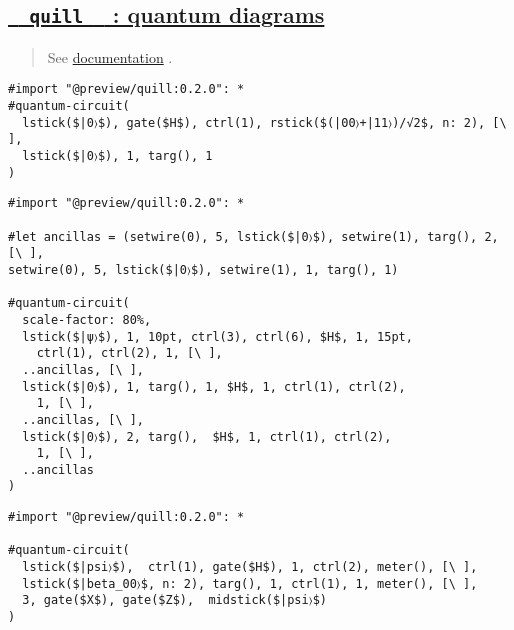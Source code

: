 \pandocbounded{}

\subsection{\texorpdfstring{\hyperref[quill-quantum-diagrams]{\texttt{\ }{\texttt{\ quill\ }}\texttt{\ }
: quantum
diagrams}}{  quill   : quantum diagrams}}\label{quill-quantum-diagrams}

\begin{quote}
See \href{https://github.com/Mc-Zen/quill/tree/main}{documentation} .
\end{quote}

\begin{verbatim}
#import "@preview/quill:0.2.0": *
#quantum-circuit(
  lstick($|0〉$), gate($H$), ctrl(1), rstick($(|00〉+|11〉)/√2$, n: 2), [\ ],
  lstick($|0〉$), 1, targ(), 1
)
\end{verbatim}

\pandocbounded{}

\begin{verbatim}
#import "@preview/quill:0.2.0": *

#let ancillas = (setwire(0), 5, lstick($|0〉$), setwire(1), targ(), 2, [\ ],
setwire(0), 5, lstick($|0〉$), setwire(1), 1, targ(), 1)

#quantum-circuit(
  scale-factor: 80%,
  lstick($|ψ〉$), 1, 10pt, ctrl(3), ctrl(6), $H$, 1, 15pt, 
    ctrl(1), ctrl(2), 1, [\ ],
  ..ancillas, [\ ],
  lstick($|0〉$), 1, targ(), 1, $H$, 1, ctrl(1), ctrl(2), 
    1, [\ ],
  ..ancillas, [\ ],
  lstick($|0〉$), 2, targ(),  $H$, 1, ctrl(1), ctrl(2), 
    1, [\ ],
  ..ancillas
)
\end{verbatim}

\pandocbounded{}

\begin{verbatim}
#import "@preview/quill:0.2.0": *

#quantum-circuit(
  lstick($|psi〉$),  ctrl(1), gate($H$), 1, ctrl(2), meter(), [\ ],
  lstick($|beta_00〉$, n: 2), targ(), 1, ctrl(1), 1, meter(), [\ ],
  3, gate($X$), gate($Z$),  midstick($|psi〉$)
)
\end{verbatim}

\pandocbounded{}


